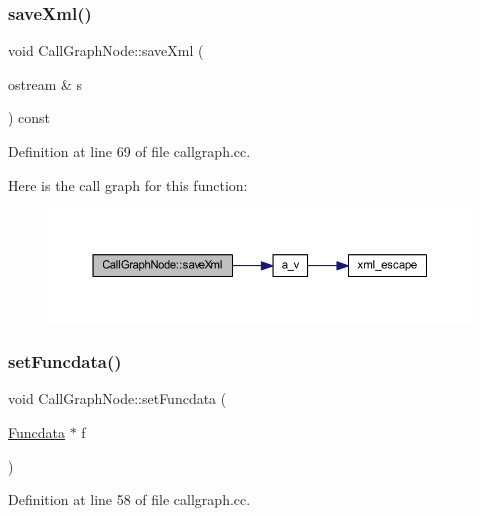 \subsubsection{\texorpdfstring{saveXml()}{saveXml()}}
{\footnotesize\ttfamily void Call\+Graph\+Node\+::save\+Xml (\begin{DoxyParamCaption}\item[{ostream \&}]{s }\end{DoxyParamCaption}) const}



Definition at line 69 of file callgraph.\+cc.

Here is the call graph for this function\+:
\nopagebreak
\begin{figure}[H]
\begin{center}
\leavevmode
\includegraphics[width=350pt]{class_call_graph_node_a0379699be791f33d9b411adb19bec7a5_cgraph}
\end{center}
\end{figure}
\mbox{\label{class_call_graph_node_adf4b77eb0513240ef97b1e0381758dad}} 
\subsubsection{\texorpdfstring{setFuncdata()}{setFuncdata()}}
{\footnotesize\ttfamily void Call\+Graph\+Node\+::set\+Funcdata (\begin{DoxyParamCaption}\item[{\mbox{\hyperlink{class_funcdata}{Funcdata}} $\ast$}]{f }\end{DoxyParamCaption})}



Definition at line 58 of file callgraph.\+cc.

